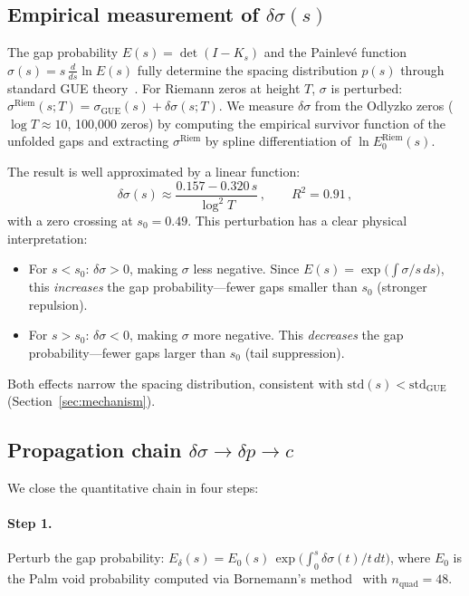 \documentclass[11pt]{article}
\theoremstyle{plain}
\theoremstyle{remark}
\begin{document}
\subsection{Empirical measurement of $\delta\sigma(s)$}

The gap probability $E(s) = \det(I - K_s)$ and the Painlev\'e function
$\sigma(s) = s\,\frac{d}{ds}\ln E(s)$ fully determine the spacing
distribution $p(s)$ through standard GUE
theory~\cite{tracywidom1994, jimbo1981}. For Riemann zeros at height $T$,
$\sigma$ is perturbed:
$\sigma^{\mathrm{Riem}}(s;T) = \sigma_{\mathrm{GUE}}(s) + \delta\sigma(s;T)$.
We measure $\delta\sigma$ from the Odlyzko zeros ($\log T \approx 10$,
100{,}000 zeros) by computing the empirical survivor function of the
unfolded gaps and extracting $\sigma^{\mathrm{Riem}}$ by spline
differentiation of $\ln E_0^{\mathrm{Riem}}(s)$.

The result is well approximated by a linear function:
\begin{equation}
\delta\sigma(s) \approx \frac{0.157 - 0.320\,s}{\log^2 T}\,,
\qquad R^2 = 0.91\,,
\label{eq:dsigma}
\end{equation}
with a zero crossing at $s_0 = 0.49$. This perturbation has a clear
physical interpretation:
\begin{itemize}
\item For $s < s_0$: $\delta\sigma > 0$, making $\sigma$ less negative.
Since $E(s) = \exp\!\bigl(\int \sigma/s\,ds\bigr)$, this \emph{increases}
the gap probability---fewer gaps smaller than $s_0$ (stronger repulsion).
\item For $s > s_0$: $\delta\sigma < 0$, making $\sigma$ more negative.
This \emph{decreases} the gap probability---fewer gaps larger than $s_0$
(tail suppression).
\end{itemize}
Both effects narrow the spacing distribution, consistent with
$\mathrm{std}(s) < \mathrm{std}_{\mathrm{GUE}}$ (Section~\ref{sec:mechanism}).

\subsection{Propagation chain $\delta\sigma \to \delta p \to c$}

We close the quantitative chain in four steps:

\paragraph{Step 1.}
Perturb the gap probability:
$E_\delta(s) = E_0(s)\,\exp\!\bigl(\int_0^s \delta\sigma(t)/t\,dt\bigr)$,
where $E_0$ is the Palm void probability computed via
Bornemann's method~\cite{bornemann2010} with $n_{\mathrm{quad}} = 48$.
\end{document}
